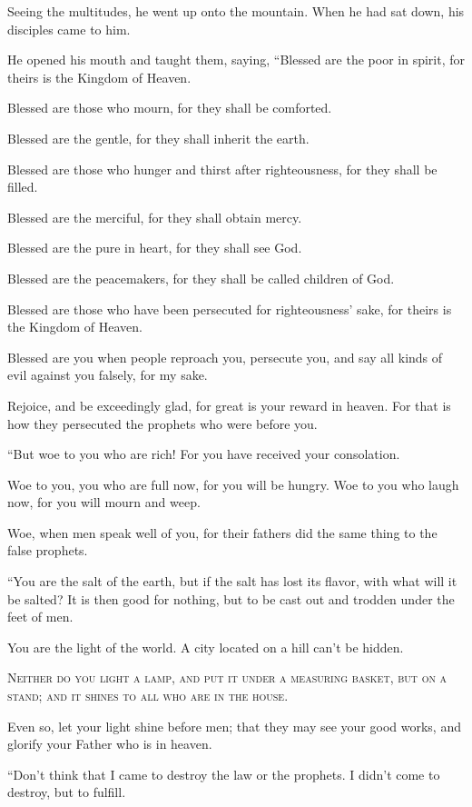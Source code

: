 Seeing the multitudes, he went up onto the mountain. When he had sat down, his disciples came to him.

He opened his mouth and taught them, saying, “Blessed are the poor in spirit, for theirs is the Kingdom of Heaven. 

Blessed are those who mourn, for they shall be comforted.

Blessed are the gentle, for they shall inherit the earth.

Blessed are those who hunger and thirst after righteousness, for they shall be filled.

Blessed are the merciful, for they shall obtain mercy.

Blessed are the pure in heart, for they shall see God.

Blessed are the peacemakers, for they shall be called children of God.

Blessed are those who have been persecuted for righteousness’ sake, for theirs is the Kingdom of Heaven.

Blessed are you when people reproach you, persecute you, and say all kinds of evil against you falsely, for my sake.

Rejoice, and be exceedingly glad, for great is your reward in heaven. For that is how they persecuted the prophets who were before you.

“But woe to you who are rich! For you have received your consolation.

Woe to you, you who are full now, for you will be hungry. Woe to you who laugh now, for you will mourn and weep.

Woe, when men speak well of you, for their fathers did the same thing to the false prophets.

“You are the salt of the earth, but if the salt has lost its flavor, with what will it be salted? It is then good for nothing, but to be cast out and trodden under the feet of men.

You are the light of the world. A city located on a hill can’t be hidden.




\lettrine{N}{either do you light a lamp, and put it under a measuring basket, but on a stand; and it shines to all who are in the house.}

Even so, let your light shine before men; that they may see your good works, and glorify your Father who is in heaven.

“Don’t think that I came to destroy the law or the prophets. I didn’t come to destroy, but to fulfill.

